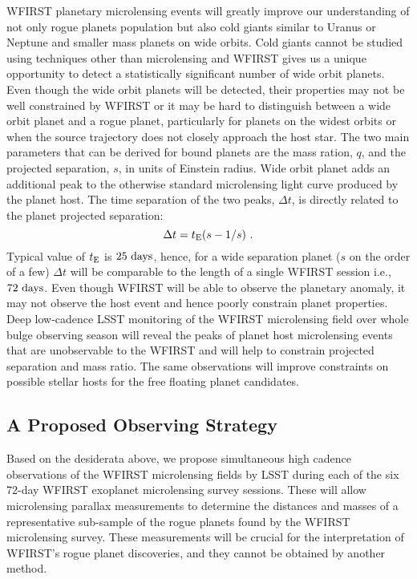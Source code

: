 WFIRST planetary microlensing events will greatly improve our
understanding of not only rogue planets population but also cold giants similar to
Uranus or Neptune and smaller mass planets on wide orbits. Cold giants
cannot be studied using techniques other than microlensing and
WFIRST gives us a unique opportunity to detect a statistically significant
number of wide orbit planets. Even though the wide orbit planets will be detected,
their properties may not be well constrained by WFIRST or it may be hard to distinguish
between a wide orbit planet and a rogue planet, particularly for planets on the widest
orbits or when the source trajectory does not closely approach the host star.
The two main parameters that can be derived for bound planets are
the mass ration, $q$, and the projected separation, $s$, in units of Einstein radius.
Wide orbit planet adds an additional peak to the otherwise
standard microlensing light curve produced by the planet host.
The time separation of the two peaks, $\Delta t$, is directly related
to the planet projected separation:
\begin{equation}
 \Delta t =  t_{\rm E}(s - {1/s}) \ .
\end{equation}
Typical value of $t_{\rm E}$ is $25~{\rm days}$, hence, for a wide
separation planet ($s$ on the order of a few) $\Delta t$ will be
comparable to the length of a single WFIRST session i.e., $72~{\rm days}$.
Even though WFIRST will be able to observe the planetary anomaly,
it may not observe the host event and hence poorly constrain planet properties. Deep low-cadence LSST
monitoring of the WFIRST microlensing field over whole bulge observing season
will reveal the peaks of planet host microlensing events that are unobservable
to the WFIRST and will help to constrain projected separation and mass ratio.
The same observations will improve constraints on possible stellar hosts for 
the free floating planet candidates.



\subsection{A Proposed Observing Strategy}
\label{sec:\secname:proposal}

Based on the desiderata above, we
propose simultaneous high cadence observations of the WFIRST microlensing fields
by LSST during each
of the six 72-day WFIRST exoplanet microlensing survey sessions. These
will allow microlensing parallax measurements to determine the distances
and masses of a representative sub-sample of the rogue planets found by
the WFIRST microlensing survey. These measurements will be crucial for
the interpretation of WFIRST's rogue planet discoveries, and they
cannot be obtained by another method.

